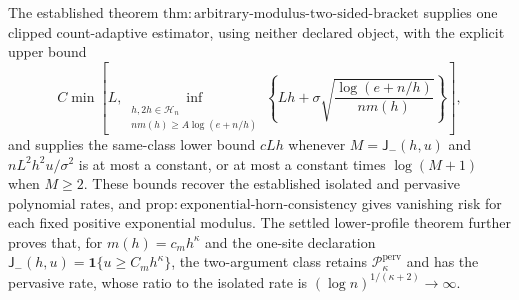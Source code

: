 The established theorem \(\mathrm{thm:arbitrary\text{-}modulus\text{-}two\text{-}sided\text{-}bracket}\) supplies one clipped count-adaptive estimator, using neither declared object, with the explicit upper bound
\[
 C\min\!\left[L,\inf_{\substack{h,2h\in\mathcal H_n\\ n m(h)\ge A\log(e+n/h)}}\left\{Lh+\sigma\sqrt{\frac{\log(e+n/h)}{n m(h)}}\right\}\right],
\]
and supplies the same-class lower bound \(cLh\) whenever \(M=\mathsf J_{-}(h,u)\) and \(nL^2h^2u/\sigma^2\) is at most a constant, or at most a constant times \(\log(M+1)\) when \(M\ge2\). These bounds recover the established isolated and pervasive polynomial rates, and \(\mathrm{prop:exponential\text{-}horn\text{-}consistency}\) gives vanishing risk for each fixed positive exponential modulus. The settled lower-profile theorem further proves that, for \(m(h)=c_mh^\kappa\) and the one-site declaration \(\mathsf J_{-}(h,u)=\mathbf 1\{u\ge C_mh^\kappa\}\), the two-argument class retains \(\mathcal P_{\kappa}^{\mathrm{perv}}\) and has the pervasive rate, whose ratio to the isolated rate is \((\log n)^{1/(\kappa+2)}\to\infty\).